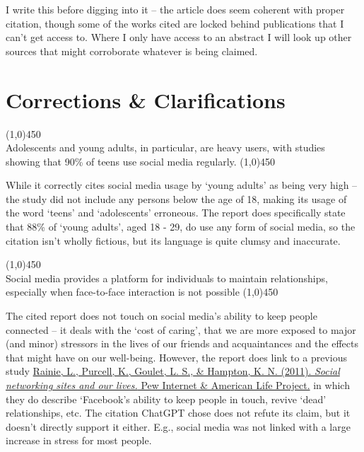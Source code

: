 \documentclass[12pt]{article}
\begin{document}
I write this before digging into it -- the article does seem coherent with proper citation, though some of the works cited are locked behind publications that I can't get access to. Where I only have access to an abstract I will look up other sources that might corroborate whatever is being claimed.

\section{Corrections \& Clarifications}

\begin{center}
    \line(1,0){450}\\
    Adolescents and young adults, in particular, are heavy users, with studies showing that 90\% of teens use social media regularly.\cite{smith2018}
    \line(1,0){450}
\end{center}
While it correctly cites social media usage by `young adults' as being very high -- the study did not include any persons below the age of 18, making its usage of the word `teens' and `adolescents' erroneous. The report does specifically state that 88\% of `young adults', aged 18 - 29, do use any form of social media, so the citation isn't wholly fictious, but its language is quite clumsy and inaccurate.

\begin{center}
    \line(1,0){450}\\
    Social media provides a platform for individuals to maintain relationships, especially when face-to-face interaction is not possible\cite{hampton2014}
    \line(1,0){450}
\end{center}
The cited report does not touch on social media's ability to keep people connected -- it deals with the `cost of caring', that we are more exposed to major (and minor) stressors in the lives of our friends and acquaintances and the effects that might have on our well-being. However, the report does link to a previous study  \href{https://www.pewresearch.org/internet/2011/06/16/social-networking-sites-and-our-lives/}{Rainie, L., Purcell, K., Goulet, L. S., \& Hampton, K. N. (2011). \textit{Social networking sites and our lives.} Pew Internet \& American Life Project.}
in which they do describe `Facebook's ability to keep people in touch, revive `dead' relationships, etc. The citation ChatGPT chose does not refute its claim, but it doesn't directly support it either. E.g., social media was not linked with a large increase in stress for most people.
\end{document}
